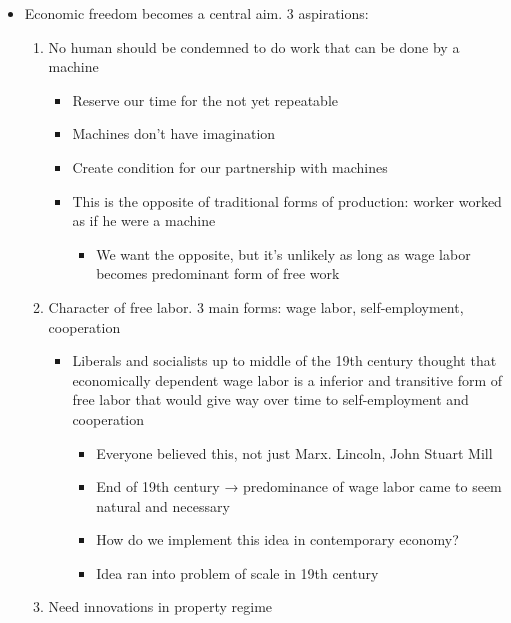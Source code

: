\begin{itemize}
\tightlist
\item
  Economic freedom becomes a central aim. 3 aspirations:

  \begin{enumerate}
  \def\labelenumi{\arabic{enumi}.}
  \tightlist
  \item
    No human should be condemned to do work that can be done by a
    machine

    \begin{itemize}
    \tightlist
    \item
      Reserve our time for the not yet repeatable
    \item
      Machines don't have imagination
    \item
      Create condition for our partnership with machines
    \item
      This is the opposite of traditional forms of production: worker
      worked as if he were a machine

      \begin{itemize}
      \tightlist
      \item
        We want the opposite, but it's unlikely as long as wage labor
        becomes predominant form of free work
      \end{itemize}
    \end{itemize}
  \item
    Character of free labor. 3 main forms: wage labor, self-employment,
    cooperation

    \begin{itemize}
    \tightlist
    \item
      Liberals and socialists up to middle of the 19th century thought
      that economically dependent wage labor is a inferior and
      transitive form of free labor that would give way over time to
      self-employment and cooperation

      \begin{itemize}
      \tightlist
      \item
        Everyone believed this, not just Marx. Lincoln, John Stuart Mill
      \item
        End of 19th century → predominance of wage labor came to seem
        natural and necessary
      \item
        How do we implement this idea in contemporary economy?
      \item
        Idea ran into problem of scale in 19th century
      \end{itemize}
    \end{itemize}
  \item
    Need innovations in property regime


\end{enumerate}
\end{itemize}

